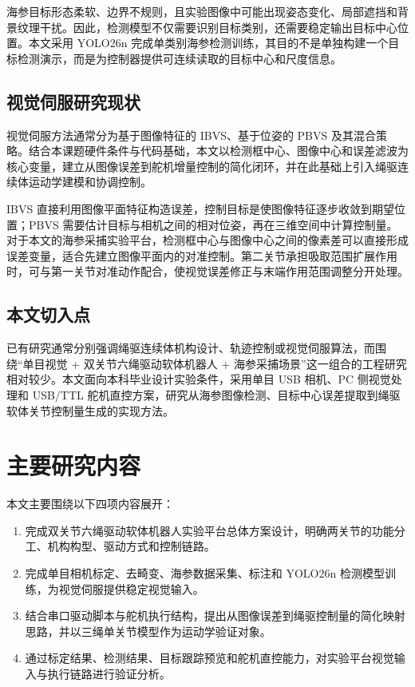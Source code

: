 \documentclass[UTF8,zihao=-4,oneside]{ctexrep}
\begin{document}
海参目标形态柔软、边界不规则，且实验图像中可能出现姿态变化、局部遮挡和背景纹理干扰。因此，检测模型不仅需要识别目标类别，还需要稳定输出目标中心位置。本文采用 YOLO26n 完成单类别海参检测训练，其目的不是单独构建一个目标检测演示，而是为控制器提供可连续读取的目标中心和尺度信息。

\subsection{视觉伺服研究现状}

视觉伺服方法通常分为基于图像特征的 IBVS、基于位姿的 PBVS 及其混合策略。结合本课题硬件条件与代码基础，本文以检测框中心、图像中心和误差滤波为核心变量，建立从图像误差到舵机增量控制的简化闭环，并在此基础上引入绳驱连续体运动学建模和协调控制。

IBVS 直接利用图像平面特征构造误差，控制目标是使图像特征逐步收敛到期望位置；PBVS 需要估计目标与相机之间的相对位姿，再在三维空间中计算控制量。对于本文的海参采捕实验平台，检测框中心与图像中心之间的像素差可以直接形成误差变量，适合先建立图像平面内的对准控制。第二关节承担吸取范围扩展作用时，可与第一关节对准动作配合，使视觉误差修正与末端作用范围调整分开处理。

\subsection{本文切入点}

已有研究通常分别强调绳驱连续体机构设计、轨迹控制或视觉伺服算法，而围绕“单目视觉 + 双关节六绳驱动软体机器人 + 海参采捕场景”这一组合的工程研究相对较少。本文面向本科毕业设计实验条件，采用单目 USB 相机、PC 侧视觉处理和 USB/TTL 舵机直控方案，研究从海参图像检测、目标中心误差提取到绳驱软体关节控制量生成的实现方法。

\section{主要研究内容}

本文主要围绕以下四项内容展开：
\begin{enumerate}
  \item 完成双关节六绳驱动软体机器人实验平台总体方案设计，明确两关节的功能分工、机构构型、驱动方式和控制链路。
  \item 完成单目相机标定、去畸变、海参数据采集、标注和 YOLO26n 检测模型训练，为视觉伺服提供稳定视觉输入。
  \item 结合串口驱动脚本与舵机执行结构，提出从图像误差到绳驱控制量的简化映射思路，并以三绳单关节模型作为运动学验证对象。
  \item 通过标定结果、检测结果、目标跟踪预览和舵机直控能力，对实验平台视觉输入与执行链路进行验证分析。
\end{enumerate}
\end{document}
